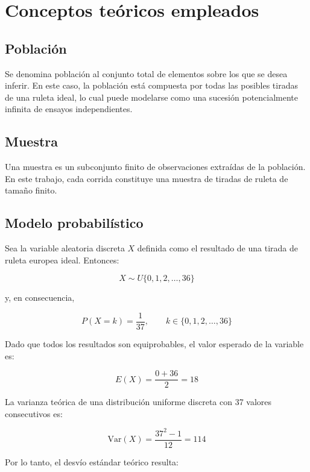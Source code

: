 \documentclass{article}
\begin{document}
\section{Conceptos teóricos empleados}

\subsection{Población}
Se denomina población al conjunto total de elementos sobre los que se desea inferir. En este caso, la población está compuesta por todas las posibles tiradas de una ruleta ideal, lo cual puede modelarse como una sucesión potencialmente infinita de ensayos independientes.

\subsection{Muestra}
Una muestra es un subconjunto finito de observaciones extraídas de la población. En este trabajo, cada corrida constituye una muestra de tiradas de ruleta de tamaño finito.

\subsection{Modelo probabilístico}
Sea la variable aleatoria discreta $X$ definida como el resultado de una tirada de ruleta europea ideal. Entonces:

\begin{equation}
X \sim U\{0,1,2,\dots,36\}
\end{equation}

y, en consecuencia,

\begin{equation}
P(X = k) = \frac{1}{37}, \qquad k \in \{0,1,2,\dots,36\}
\end{equation}

Dado que todos los resultados son equiprobables, el valor esperado de la variable es:

\begin{equation}
E(X) = \frac{0 + 36}{2} = 18
\end{equation}

La varianza teórica de una distribución uniforme discreta con 37 valores consecutivos es:

\begin{equation}
\mathrm{Var}(X) = \frac{37^2 - 1}{12} = 114
\end{equation}

Por lo tanto, el desvío estándar teórico resulta:
\end{document}
